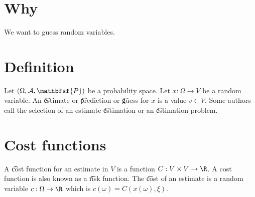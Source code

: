 
\section*{Why}

We want to guess random variables.

\section*{Definition}

Let $(\Omega , \mathcal{A} , \mathbfsf{P} )$ be a probability space.
Let $x: \Omega  \to V$ be a random variable.
An \t{estimate} or \t{prediction} or \t{guess} for $x$ is a value $v \in V$.
Some authors call the selection of an estimate \t{estimation} or an \t{estimation problem}.

\section*{Cost functions}

A \t{cost function} for an estimate in $V$ is a function $C: V \times V \to \R $.
A cost function is also known as a \t{risk function}.
The \t{cost} of an estimate is a random variable $c: \Omega \to \R $ which is $c(\omega ) = C(x(\omega ), \xi )$.

\blankpage